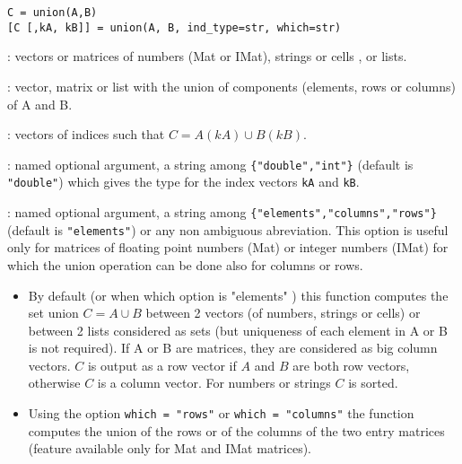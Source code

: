 
\begin{mandesc}
\end{mandesc}

\begin{calling_sequence}
\begin{verbatim}
C = union(A,B)
[C [,kA, kB]] = union(A, B, ind_type=str, which=str)
\end{verbatim}
\end{calling_sequence}
\begin{parameters}
  \begin{varlist}
    : vectors or matrices of numbers (Mat or IMat), strings or cells
    , or lists.

    : vector, matrix or list with the union of components (elements,
    rows or columns) of A and B.

    : vectors of indices such that $C = A(kA) \cup B(kB)$.

    : named optional argument, a string among
    \verb+{"double","int"}+ (default is \verb+"double"+) which gives the type
    for the index vectors \verb+kA+ and \verb+kB+.

    : named optional argument, a string among
    \verb+{"elements","columns","rows"}+ (default is \verb+"elements"+) or any
    non ambiguous abreviation. This option is useful only for matrices of
    floating point numbers (Mat) or integer numbers (IMat) for which the union
    operation can be done also for columns or rows.
  \end{varlist}
\end{parameters}

\begin{mandescription}
  \begin{itemize}
  \item  By default (or when which option is "elements" ) this function computes the set 
    union $C = A \cup B$ between 2 vectors (of numbers, strings or cells) or between 2
    lists considered as sets (but uniqueness of each element in A or B is not
    required). If A or B are matrices, they  are considered as big column vectors.
    $C$ is output as a row vector if  $A$ and $B$ are both 
    row vectors, otherwise $C$ is a column vector. For numbers or strings $C$ 
    is sorted. 

  \item  Using the option \verb+which = "rows"+ or \verb+which = "columns"+  the function 
    computes the union of the rows or of the columns of the two entry 
    matrices (feature available only for Mat and IMat matrices).
\end{itemize}
\end{mandescription}


